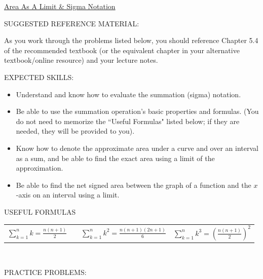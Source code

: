 \documentclass[12pt]{article}
\begin{document}
\begin{center}
\underline{\LARGE{Area As A Limit \& Sigma Notation}}
\end{center}

\noindent SUGGESTED REFERENCE MATERIAL:

\bigskip

\noindent As you work through the problems listed below, you should reference Chapter 5.4 of the recommended textbook (or the equivalent chapter in your alternative textbook/online resource) and your lecture notes.

\bigskip

\noindent EXPECTED SKILLS:

\begin{itemize}

\item Understand and know how to evaluate the summation (sigma) notation. 

\item Be able to use the summation operation's basic properties and formulas. (You do not need to memorize the ``Useful Formulas" listed below; if they are needed, they will be provided to you). 

\item Know how to denote the approximate area under a curve and over an interval as a sum, and be able to find the exact area using a limit of the approximation. 

\item Be able to find the net signed area between the graph of a function and the $x$-axis on an interval using a limit.

\end{itemize}

\noindent USEFUL FORMULAS\\

\bigskip

\begin{tabular}{p{0.3\linewidth} p{0.35\linewidth} p{0.33\linewidth}}
$\sum_{k=1}^n{k}=\frac{n(n+1)}{2}$ & $\sum_{k=1}^n{k^2}=\frac{n(n+1)(2n+1)}{6}$ & $\sum_{k=1}^n{k^3}=\left(\frac{n(n+1)}{2}\right)^2$
\end{tabular}\\

\bigskip

\noindent PRACTICE PROBLEMS:

\medskip

\end{document}
